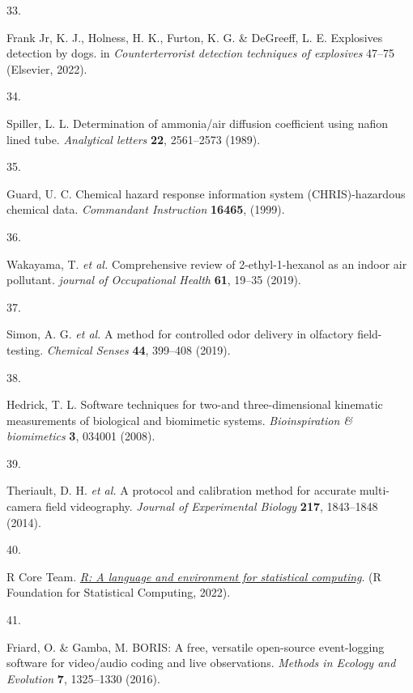 \documentclass[
]{article}
\newlength{\cslhangindent}
\newlength{\csllabelwidth}
\newlength{\cslentryspacingunit} %
\newenvironment{CSLReferences}[2] %
 {%
  \setlength{\parindent}{0pt}
  \ifodd #1
  \let\oldpar\par
  \def\par{\hangindent=\cslhangindent\oldpar}
  \fi
  \setlength{\parskip}{#2\cslentryspacingunit}
 }%
 {}
\newcommand{\CSLLeftMargin}[1]{\parbox[t]{\csllabelwidth}{#1}}
\newcommand{\CSLRightInline}[1]{\parbox[t]{\linewidth - \csllabelwidth}{#1}\break}
\begin{document}
\begin{CSLReferences}{0}{0}
\leavevmode{}%
\CSLLeftMargin{33. }%
\CSLRightInline{Frank Jr, K. J., Holness, H. K., Furton, K. G. \& DeGreeff, L. E. Explosives detection by dogs. in \emph{Counterterrorist detection techniques of explosives} 47--75 (Elsevier, 2022).}

\leavevmode{}%
\CSLLeftMargin{34. }%
\CSLRightInline{Spiller, L. L. Determination of ammonia/air diffusion coefficient using nafion lined tube. \emph{Analytical letters} \textbf{22}, 2561--2573 (1989).}

\leavevmode{}%
\CSLLeftMargin{35. }%
\CSLRightInline{Guard, U. C. Chemical hazard response information system (CHRIS)-hazardous chemical data. \emph{Commandant Instruction} \textbf{16465}, (1999).}

\leavevmode{}%
\CSLLeftMargin{36. }%
\CSLRightInline{Wakayama, T. \emph{et al.} Comprehensive review of 2-ethyl-1-hexanol as an indoor air pollutant. \emph{journal of Occupational Health} \textbf{61}, 19--35 (2019).}

\leavevmode{}%
\CSLLeftMargin{37. }%
\CSLRightInline{Simon, A. G. \emph{et al.} A method for controlled odor delivery in olfactory field-testing. \emph{Chemical Senses} \textbf{44}, 399--408 (2019).}

\leavevmode{}%
\CSLLeftMargin{38. }%
\CSLRightInline{Hedrick, T. L. Software techniques for two-and three-dimensional kinematic measurements of biological and biomimetic systems. \emph{Bioinspiration \& biomimetics} \textbf{3}, 034001 (2008).}

\leavevmode{}%
\CSLLeftMargin{39. }%
\CSLRightInline{Theriault, D. H. \emph{et al.} A protocol and calibration method for accurate multi-camera field videography. \emph{Journal of Experimental Biology} \textbf{217}, 1843--1848 (2014).}

\leavevmode{}%
\CSLLeftMargin{40. }%
\CSLRightInline{R Core Team. \emph{\href{https://www.R-project.org}{R: A language and environment for statistical computing}}. (R Foundation for Statistical Computing, 2022).}

\leavevmode{}%
\CSLLeftMargin{41. }%
\CSLRightInline{Friard, O. \& Gamba, M. {BORIS}: A free, versatile open-source event-logging software for video/audio coding and live observations. \emph{Methods in Ecology and Evolution} \textbf{7}, 1325--1330 (2016).}


\end{CSLReferences}
\end{document}
